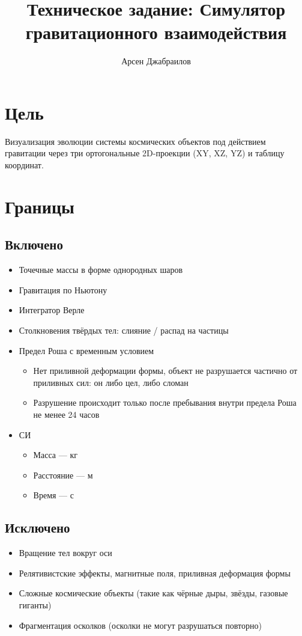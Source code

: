 \documentclass[14pt]{extarticle}
\title{Техническое задание: Симулятор гравитационного взаимодействия}
\author{Арсен Джабраилов}
\begin{document}
	
	\maketitle
	
	\section{Цель}
	Визуализация эволюции системы космических объектов под действием гравитации через три ортогональные 2D-проекции (XY, XZ, YZ) и таблицу координат.
	
	\section{Границы}
	
	\subsection{Включено}
	\begin{itemize}
		\item Точечные массы в форме однородных шаров
		\item Гравитация по Ньютону%
		\item Интегратор Верле
		\item Столкновения твёрдых тел: слияние / распад на частицы
		\item Предел Роша с временным условием
		\begin{itemize}
			\item Нет приливной деформации формы, объект не разрушается частично от приливных сил: он либо цел, либо сломан
			\item Разрушение происходит только после пребывания внутри предела Роша не менее 24 часов
		\end{itemize}
		\item СИ
		\begin{itemize}
			\item Масса --- кг
			\item Расстояние --- м
			\item Время --- с
		\end{itemize}
	\end{itemize}
	
	\subsection{Исключено}
	\begin{itemize}
		\item Вращение тел вокруг оси
		\item Релятивистские эффекты, магнитные поля, приливная деформация формы
		\item Сложные космические объекты (такие как чёрные дыры, звёзды, газовые гиганты)
		\item Фрагментация осколков (осколки не могут разрушаться повторно)
	\end{itemize}
	
\end{document}
